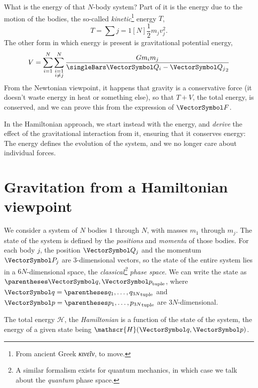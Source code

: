 \documentclass[10pt, a4paper, twoside]{basestyle}
\begin{document}
What is the energy of that $N$-body system? Part of it is the energy due to the
motion of the bodies, the so-called \emph{kinetic}\footnote{From ancient Greek
\emph{κινεῖν}, to move.} energy $T$, \[
T = \sum{j=1}[N] \frac12 m_j v_j^2.
\]
The other form in which energy is present is gravitational potential energy,
\[
V = \sum{i = 1}[N]\sum{\substack {i = 1 \\ i \neq j}}[N] \frac{G m_i m_j}
{\norm{\vQ_i - \vQ_j}}
\]
From the Newtonian viewpoint, it happens that gravity is a conservative force
(it doesn't waste energy in heat or something else), so that $T + V$, the total
energy, is conserved, and we can prove this from  the expression of $\vF$.

In the Hamiltonian approach, we start instead with the energy, and \emph{derive}
the effect of the gravitational interaction from it, ensuring that it conserves
energy: The energy defines the evolution of the system, and we no longer care
about individual forces.

\newcommand{\Hamiltonian}{\mathscr{H}}
\section{Gravitation from a Hamiltonian viewpoint}
We consider a system of $N$ bodies $1$ through $N$, with masses $m_1$ through
$m_j$. The state of the system is defined by the \emph{positions} and
\emph{momenta} of those bodies. For each body $j$, the position $\vQ_j$ and the
momentum $\vP_j$ are 3-dimensional vectors, so the state of the entire system
lies in a $6N$-dimensional space, the \emph{classical\footnote{A similar formalism exists for quantum
mechanics, in which case we talk about the \emph{quantum} phase space.} phase space}.
We can write the state as $\tuple{\vq, \vp}$, where $\vq = \tuple{q_1, \dotsc,
q_{3N}}$ and $\vp =  \tuple{p_1, \dotsc, p_{3N}}$ are $3N$-dimensional.

The total energy $\Hamiltonian$, the \emph{Hamiltonian} is a function
of the state of the system, the energy of a given state being $\Hamiltonian(\vq,
\vp)$.
\end{document}
